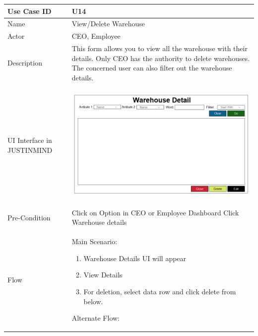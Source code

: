 \documentclass[12pt,a4paper]{report}
\begin{document}
\begin{tabular}{ | m{3cm} | m{12cm}| } \hline

Use Case ID &  U14 \\\hline

Name  	    &  View/Delete Warehouse \\ \hline

Actor     	&  CEO, Employee\\ \hline

Description &  This form allows you to view all the warehouse with their details. Only CEO has the authority to delete warehouses. The concerned user can also filter out the warehouse details. \\ \hline

UI Interface in JUSTINMIND & \begin{center} \includegraphics[scale=0.3]{./UIs for Latex Reports/UI-016 ViewAndDelete Warehouse@1x.png}\end{center}  \\ \hline

Pre-Condition & Click on Option in CEO or Employee Dashboard Click Warehouse details  \\ \hline


Flow & Main Scenario:

\begin{enumerate}
\item   Warehouse Details UI will appear
\item  View Details
\item  For deletion, select data row and click delete from below.


\end{enumerate}

Alternate Flow:


\end{tabular}
\end{document}
